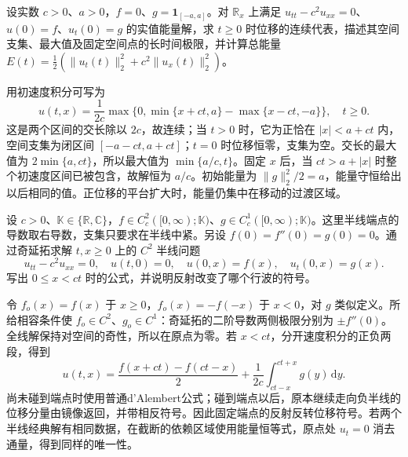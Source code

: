 \begin{exercise}\label{b2:ex:09-rectangular-velocity}
设实数 \(c>0\)、\(a>0\)，\(f=0\)、\(g=\mathbf1_{[-a,a]}\)。对 \(\mathbb R_x\) 上满足 \(u_{tt}-c^2u_{xx}=0\)、\(u(0)=f\)、\(u_t(0)=g\) 的实值能量解，求 \(t\geq0\) 时位移的连续代表，描述其空间支集、最大值及固定空间点的长时间极限，并计算总能量 \(E(t)=\frac12(\|u_t(t)\|_2^2+c^2\|u_x(t)\|_2^2)\)。
\end{exercise}
\begin{solution}
用初速度积分可写为
\[
 u(t,x)=\dfrac1{2c}\max\{0,\min\{x+ct,a\}-\max\{x-ct,-a\}\},\quad t\geq0.
\]
这是两个区间的交长除以 \(2c\)，故连续；当 \(t>0\) 时，它为正恰在 \(|x|<a+ct\) 内，空间支集为闭区间 \([-a-ct,a+ct]\)；\(t=0\) 时位移恒零，支集为空。交长的最大值为 \(2\min\{a,ct\}\)，所以最大值为 \(\min\{a/c,t\}\)。固定 \(x\) 后，当 \(ct>a+|x|\) 时整个初速度区间已被包含，故解恒为 \(a/c\)。初始能量为 \(\|g\|_2^2/2=a\)，能量守恒给出以后相同的值。正位移的平台扩大时，能量仍集中在移动的过渡区域。
\end{solution}

\begin{exercise}\label{b2:ex:09-halfline-reflection}
设 \(c>0\)、\(\mathbb K\in\{\mathbb R,\mathbb C\}\)，\(f\in C_c^2([0,\infty);\mathbb K)\)、\(g\in C_c^1([0,\infty);\mathbb K)\)。这里半线端点的导数取右导数，支集只要求在半线中紧。另设 \(f(0)=f''(0)=g(0)=0\)。通过奇延拓求解 \(t,x\geq0\) 上的 \(C^2\) 半线问题
\[
 u_{tt}-c^2u_{xx}=0,\quad u(t,0)=0,\quad
 u(0,x)=f(x),\quad u_t(0,x)=g(x).
\]
写出 \(0\leq x<ct\) 时的公式，并说明反射改变了哪个行波的符号。
\end{exercise}
\begin{solution}
令 \(f_o(x)=f(x)\) 于 \(x\geq0\)，\(f_o(x)=-f(-x)\) 于 \(x<0\)，对 \(g\) 类似定义。所给相容条件使 \(f_o\in C^2\)、\(g_o\in C^1\)：奇延拓的二阶导数两侧极限分别为 \(\pm f''(0)\)。全线解保持对空间的奇性，所以在原点为零。若 \(x<ct\)，分开速度积分的正负两段，得到
\[
 u(t,x)=\dfrac{f(x+ct)-f(ct-x)}2
 +\dfrac1{2c}\int_{ct-x}^{ct+x}g(y)\,\mathrm{d}y.
\]
尚未碰到端点时使用普通d'Alembert公式；碰到端点以后，原本继续走向负半线的位移分量由镜像返回，并带相反符号。因此固定端点的反射反转位移符号。若两个半线经典解有相同数据，在截断的依赖区域使用能量恒等式，原点处 \(u_t=0\) 消去通量，得到同样的唯一性。
\end{solution}

